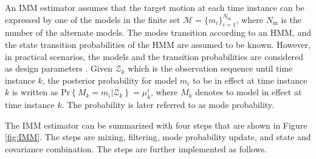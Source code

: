 \documentclass[english, 12pt, a4paper, elec, utf8, a-1b, online]{aaltothesis}
\renewcommand{\Pr}[1]{\text{Pr}\left\{ #1 \right\}}
\newcommand{\modeprob}{\mu_k^i}
\newcommand{\nmodels}{{N_\text{m}}}
\begin{document}
An IMM estimator assumes that the target motion at each time instance can be expressed by one of the models in the finite set $\mathcal{M} = \{ m_i \}_{i=1}^\nmodels$, where $\nmodels$ is the number of the alternate models.
The modes transition according to an HMM, and the state transition probabilities of the HMM are assumed to be known.
However, in practical scenarios, the models and the transition probabilities are considered as design parameters \cite{Simeonova2002}.
Given $\mathcal{Z}_k$ which is the observation sequence until time instance $k$, the posterior probability for model $m_i$ to be in effect at time instance $k$ is written as $\Pr{M_k=m_i | \mathcal{Z}_k} = \modeprob$, where $M_k$ denotes to model in effect at time instance $k$.
The probability is later referred to as mode probability.

The IMM estimator can be summarized with four steps that are shown in Figure \ref{fig:IMM}.
The steps are mixing, filtering, mode probability update, and state and covariance combination. 
The steps are further implemented as follows.
\end{document}
